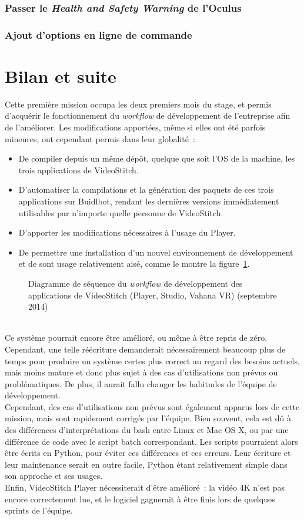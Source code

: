 \subsubsection{Passer le \textit{Health and Safety Warning} de l'Oculus}

\subsubsection{Ajout d'options en ligne de commande}


\section{Bilan et suite}
Cette première mission occupa les deux premiers mois du stage, et permis d'acquérir
le fonctionnement du \textit{workflow} de développement de l'entreprise afin de l'améliorer.
Les modifications apportées, même si elles ont été parfois mineures, ont cependant permis dans leur globalité~:
\begin{itemize}
 \item De compiler depuis un même dépôt, quelque que soit l'OS de la machine, les trois applications de VideoStitch.
 \item D'automatiser la compilations et la génération des paquets de ces trois applications 
 sur Buidlbot, rendant les dernières versions immédiatement utilisables par n'importe 
 quelle personne de VideoStitch.
 \item D'apporter les modifications nécessaires à l'usage du Player.
 \item De permettre une installation d'un nouvel environnement de développement et
 de sont usage relativement aisé, comme le montre la figure~\ref{workflow-final}.
\end{itemize}
\begin{figure}
  \centering
  \caption{Diagramme de séquence du \textit{workflow} de développement des applications de VideoStitch (Player, Studio, Vahana VR) (septembre 2014)}
	\label{workflow-final}
\end{figure}
\ \\
Ce système pourrait encore être amélioré, ou même à être repris de zéro. Cependant, 
une telle réécriture demanderait nécessairement beaucoup plus de temps pour
produire un système certes plus correct au regard des besoins actuels, mais moins mature
et donc plus sujet à des cas d'utilisations non prévus ou problématiques. De plus,
il aurait fallu changer les habitudes de l'équipe de développement.\\
Cependant, des cas d'utilisations non prévus sont également apparus lors de cette mission,
mais sont rapidement corrigés par l'équipe. Bien souvent, cela est dû à des différences
d'interprétations du bash entre Linux et Mac OS X, ou par une différence de code avec
le script batch correspondant. Les scripts pourraient alors être écrits en Python, pour
éviter ces différences et ces erreurs. Leur écriture et leur maintenance serait 
en outre facile, Python étant relativement simple dans son approche et ses usages.\\
Enfin, VideoStitch Player nécessiterait d'être amélioré~: la vidéo
4K n'est pas encore correctement lue, et le logiciel gagnerait à être finis lors
de quelques sprints de l'équipe.
